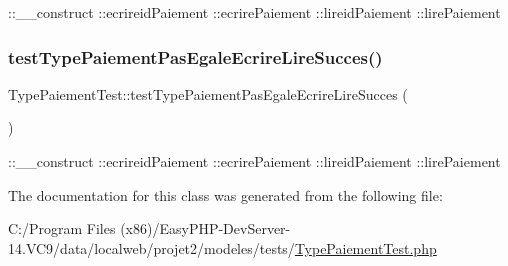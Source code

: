 \+::\+\_\+\+\_\+construct  \+::ecrireid\+Paiement  \+::ecrire\+Paiement  \+::lireid\+Paiement  \+::lire\+Paiement \mbox{\label{class_type_paiement_test_a7207d2e5d9d3e400f6b9848d59c32464}} 
\subsubsection{\texorpdfstring{test\+Type\+Paiement\+Pas\+Egale\+Ecrire\+Lire\+Succes()}{testTypePaiementPasEgaleEcrireLireSucces()}}
{\footnotesize\ttfamily Type\+Paiement\+Test\+::test\+Type\+Paiement\+Pas\+Egale\+Ecrire\+Lire\+Succes (\begin{DoxyParamCaption}{ }\end{DoxyParamCaption})}

\+::\+\_\+\+\_\+construct  \+::ecrireid\+Paiement  \+::ecrire\+Paiement  \+::lireid\+Paiement  \+::lire\+Paiement 

The documentation for this class was generated from the following file\+:\begin{DoxyCompactItemize}
\item 
C\+:/\+Program Files (x86)/\+Easy\+P\+H\+P-\/\+Dev\+Server-\/14.\+V\+C9/data/localweb/projet2/modeles/tests/\hyperlink{_type_paiement_test_8php}{Type\+Paiement\+Test.\+php}\end{DoxyCompactItemize}
